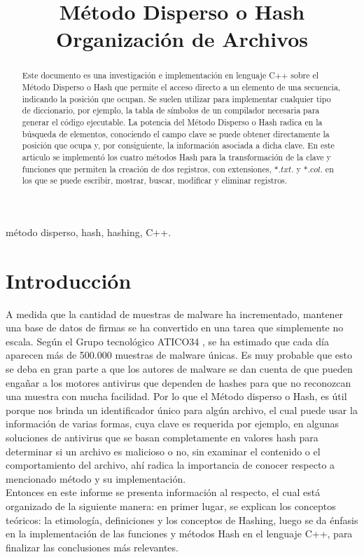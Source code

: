 \documentclass[10pt,conference]{IEEEtran}
\title{Método Disperso o Hash \\ {\Large Organización de Archivos}}
\author{
\IEEEauthorblockN{1\textsuperscript{do} Angely Mendez}
\IEEEauthorblockA{\textit{Escuela de Informática} \\
\textit{Universidad Nacional de Trujillo}\\
Trujillo, Perú \\
t052701020@unitru.edu.pe}
\and
\IEEEauthorblockN{2\textsuperscript{ero} Ciara Mendez}
\IEEEauthorblockA{\textit{Escuela de Informática} \\
\textit{Universidad Nacional de Trujillo}\\
Trujillo, Perú \\
t022700920@unitru.edu.pe}
}
\begin{document}
\renewcommand{\IEEEkeywordsname}{{\bfseries Palabras claves:}} %

\maketitle
\begin{abstract}
Este documento es una investigación e implementación en lenguaje C++ sobre el Método Disperso o Hash que permite el acceso directo a un elemento de una secuencia, indicando la posición que ocupan. Se suelen utilizar para implementar cualquier tipo de diccionario, por ejemplo, la tabla de símbolos de un compilador necesaria para generar el código ejecutable. La potencia del Método Disperso o Hash radica en la búsqueda de elementos, conociendo el campo clave se puede obtener directamente la posición que ocupa y, por consiguiente, la información asociada a dicha clave. En este articulo se implementó los cuatro métodos Hash para la transformación de la clave y funciones que permiten la creación de dos registros, con extensiones, $*.txt$. y $*.col$. en los que se puede escribir, mostrar, buscar, modificar y eliminar registros. 
\end{abstract}

\begin{IEEEkeywords}
método disperso, hash, hashing, C++.
\end{IEEEkeywords}

\section{\textbf{Introducción}}
A medida que la cantidad de muestras de malware ha incrementado, mantener una base de datos de firmas se ha convertido en una tarea que simplemente no escala. Según el Grupo tecnológico ATICO34 \cite{online}, se ha estimado que cada día aparecen más de 500.000 muestras de malware únicas. Es muy probable que esto se deba en gran parte a que los autores de malware se dan cuenta de que pueden engañar a los motores antivirus que dependen de hashes para que no reconozcan una muestra con mucha facilidad.
Por lo que el Método disperso o Hash, es útil porque nos brinda un identificador único para algún archivo, el cual puede usar la información de varias formas, cuya clave es requerida por ejemplo, en algunas soluciones de antivirus que se basan completamente en valores hash para determinar si un archivo es malicioso o no, sin examinar el contenido o el comportamiento del archivo, ahí radica la importancia de conocer respecto a mencionado método y su implementación. \\
Entonces en este informe se presenta información al respecto, el cual está organizado de la siguiente manera: en primer lugar, se explican los conceptos teóricos: la etimología, definiciones y los conceptos de Hashing, luego se da énfasis en la implementación de las funciones y métodos Hash en el lenguaje C++, para finalizar las conclusiones más relevantes.
\end{document}
